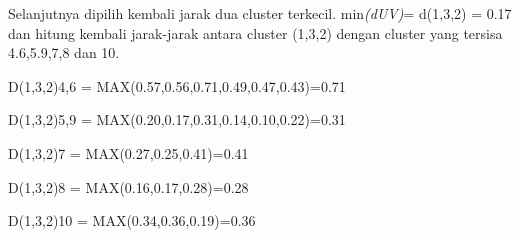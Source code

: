 \begin{enumerate}
\begin{table}[htbp]
\centering
\caption{Matrik Jarak, d(4,6)}
\label{tab:my-table}
\end{table}

Selanjutnya dipilih kembali jarak dua cluster terkecil. min\textit{(dUV)}= d(1,3,2) = 0.17 dan hitung kembali jarak-jarak antara cluster (1,3,2)  dengan cluster yang tersisa 4.6,5.9,7,8 dan 10.

D(1,3,2)4,6 = MAX(0.57,0.56,0.71,0.49,0.47,0.43)=0.71

D(1,3,2)5,9 = MAX(0.20,0.17,0.31,0.14,0.10,0.22)=0.31

D(1,3,2)7 = MAX(0.27,0.25,0.41)=0.41

D(1,3,2)8 = MAX(0.16,0.17,0.28)=0.28

D(1,3,2)10 = MAX(0.34,0.36,0.19)=0.36

\begin{table}[htbp]
\centering
\caption{ Matrik Jarak, d(1,3,2}
\label{tab:my-table}
\end{table}


\end{enumerate}
